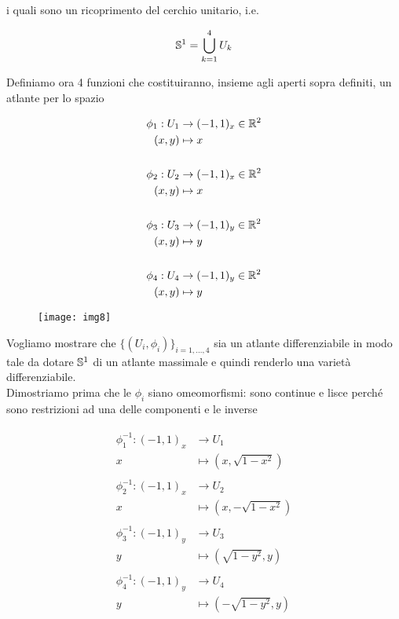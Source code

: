 i quali sono un ricoprimento del cerchio unitario, i.e.

\begin{equation}
	\S^{1} = \bigcup_{k=1}^{4} U_{k}
\end{equation}

Definiamo ora 4 funzioni che costituiranno, insieme agli aperti sopra definiti, un atlante per lo spazio

\begin{align}
	\begin{split}
		\phi_{1} : U_{1} &\to (-1,1)_{x} \in \R^{2}\\
		(x,y) &\mapsto x\\\\
		\phi_{2} : U_{2} &\to (-1,1)_{x} \in \R^{2}\\
		(x,y) &\mapsto x\\\\
		\phi_{3} : U_{3} &\to (-1,1)_{y} \in \R^{2}\\
		(x,y) &\mapsto y\\\\
		\phi_{4} : U_{4} &\to (-1,1)_{y} \in \R^{2}\\
		(x,y) &\mapsto y
	\end{split}
\end{align}

\begin{figure}[H]
\centering
\texttt{[image: img8]}
\end{figure}

Vogliamo mostrare che $ \{(U_{i},\phi_{i})\}_{i=1,\dots,4} $ sia un atlante differenziabile in modo tale da dotare $ \S^{1} $ di un atlante massimale e quindi renderlo una varietà differenziabile.\\
Dimostriamo prima che le $ \phi_{i} $ siano omeomorfismi: sono continue e lisce perché sono restrizioni ad una delle componenti e le inverse

\begin{align}
	\begin{split}
		\phi_{1}^{-1} : (-1,1)_{x} &\to U_{1}\\
		x &\mapsto (x,\sqrt{1-x^{2}})\\\\
		\phi_{2}^{-1} : (-1,1)_{x} &\to U_{2}\\
		x &\mapsto (x,-\sqrt{1-x^{2}})\\\\
		\phi_{3}^{-1} : (-1,1)_{y} &\to U_{3}\\
		y &\mapsto (\sqrt{1-y^{2}},y)\\\\
		\phi_{4}^{-1} : (-1,1)_{y} &\to U_{4}\\
		y &\mapsto (-\sqrt{1-y^{2}},y)
	\end{split}
\end{align}


